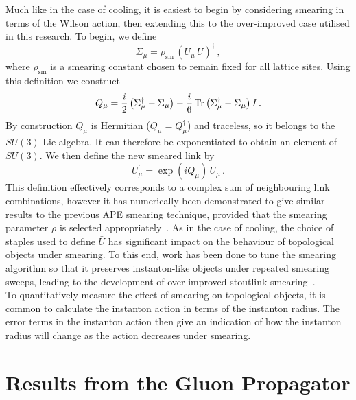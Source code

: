 Much like in the case of cooling, it is easiest to begin by considering smearing in terms of the Wilson action, then extending this to the over-improved case utilised in this research. To begin, we define
%
\begin{equation}
\Sigma_\mu = \rho_\text{sm}\,(U_\mu\,\bar{U})^\dagger\, ,
\end{equation}
%
where $\rho_\text{sm}$ is a smearing constant chosen to remain fixed for all lattice sites. Using this definition we construct
%
\begin{equation}
Q_\mu = \frac{i}{2}\left( \Sigma_\mu^\dagger - \Sigma_\mu \right) - \frac{i}{6}\operatorname{Tr}\left(\Sigma_\mu^\dagger - \Sigma_\mu\right)I\, .
\end{equation}
By construction $Q_\mu$ is Hermitian ($Q_\mu = Q_\mu^\dagger$) and traceless, so it belongs to the $SU(3)$ Lie algebra. It can therefore be exponentiated to obtain an element of $SU(3)$. We then define the new smeared link by
%
\begin{equation}
U_\mu^\prime = \exp(iQ_\mu)\,U_\mu\, .
\end{equation}
%
This definition effectively corresponds to a complex sum of neighbouring link combinations, however it has numerically been demonstrated to give similar results to the previous APE smearing technique, provided that the smearing parameter $\rho$ is selected appropriately~\cite{Morningstar:2003gk}. As in the case of cooling, the choice of staples used to define $\bar{U}$ has significant impact on the behaviour of topological objects under smearing. To this end, work has been done to tune the smearing algorithm so that it preserves instanton-like objects under repeated smearing sweeps, leading to the development of over-improved stoutlink smearing~\cite{Moran:2008ra}.\\

To quantitatively measure the effect of smearing on topological objects, it is common to calculate the instanton action in terms of the instanton radius. The error terms in the instanton action then give an indication of how the instanton radius will change as the action decreases under smearing.
\section{Results from the Gluon Propagator}\label{sec:CoolingGluProp}

